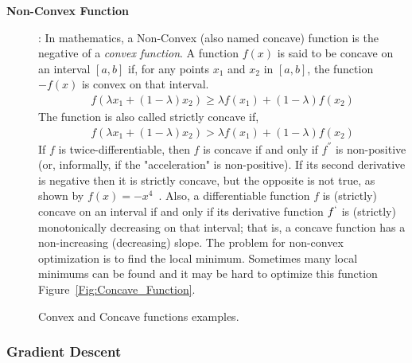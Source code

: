 \begin{description}
\item [\textbf{Non-Convex Function}]: In mathematics, a Non-Convex (also named concave) function is the negative of a \textit{convex function}. A function $f(x)$ is said to be concave on an interval $[a,b]$ if, for any points $x_1$ and $x_2$ in $[a,b]$, the function $-f(x)$ is convex on that interval.%
\begin{equation}\label{eq:concave_fun}
 \begin{split}
f(\lambda x_1 + (1-\lambda)x_2) \geq \lambda f(x_1) + (1 - \lambda) f(x_2)
 \end{split}
\end{equation}%
The function is also called strictly concave if,
\begin{equation}\label{eq:concave_fun_strictly}
 \begin{split}
f(\lambda x_1 + (1-\lambda)x_2) > \lambda f(x_1) + (1 - \lambda) f(x_2)
 \end{split}
\end{equation}%
%
If $f$ is twice-differentiable, then $f$ is concave if and only if $f^{''}$ is non-positive (or, informally, if the "acceleration" is non-positive). If its second derivative is negative then it is strictly concave, but the opposite is not true, as shown by $f(x) = −x^4$~\cite{Wiki_Concave_Function}. Also, a differentiable function $f$ is (strictly) concave on an interval if and only if its derivative function $f^`$ is (strictly) monotonically decreasing on that interval; that is, a concave function has a non-increasing (decreasing) slope. The problem for non-convex optimization is to find the local minimum. Sometimes many local minimums  can be found and it may be hard to optimize this function Figure~\ref{Fig:Concave_Function}.%
\end{description}
%
\begin{figure}[t]
 \centering
\caption{Convex and Concave functions examples.}
\end{figure}%
\subsubsection{Gradient Descent}

